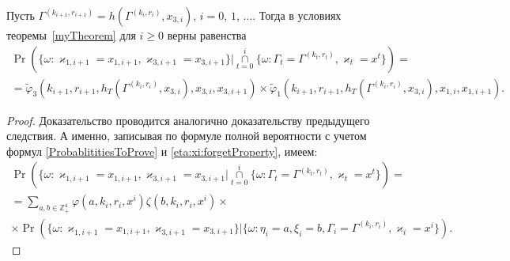 \documentclass{report}
\begin{document}
\begin{corollary}
Пусть $\Gamma^{(k_{i+1},r_{i+1})}=h(\Gamma^{(k_i,r_i)},x_{3,i})$, $i=0$, $1$, $\ldots$. Тогда в условиях теоремы~\ref{myTheorem} для $i \geqslant 0$ верны равенства
\begin{multline}
\Pr (\{ \omega \colon \varkappa_{1,i+1} = x_{1,i+1}, \varkappa_{3,i+1} = x_{3,i+1}\} |\mathop{\cap}\limits_{t=0}^{i}\{\omega\colon \Gamma_t=\Gamma^{(k_t,r_t)}, \varkappa_t=x^t\})=\\
=\widetilde{\varphi}_3(k_{i+1},r_{i+1},h_T(\Gamma^{(k_i,r_i)},x_{3,i}),x_{3,i},x_{3,i+1}) \times \widetilde{\varphi}_1(k_{i+1},r_{i+1},h_T(\Gamma^{(k_i,r_i)},x_{3,i}),x_{1,i},x_{1,i+1}).
\label{kappa:1:kappa:3:conditional}
\end{multline}
\end{corollary}
\begin{proof}
Доказательство проводится аналогично доказательству предыдущего следствия. А именно, записывая по формуле полной вероятности с учетом формул \eqref{ProbablititiesToProve} и \eqref{eta:xi:forgetProperty}, имеем:
\begin{multline*}
\Pr (\{ \omega \colon \varkappa_{1,i+1} = x_{1,i+1}, \varkappa_{3,i+1} = x_{3,i+1} |\mathop{\cap}\limits_{t=0}^{i}\{\omega\colon \Gamma_t=\Gamma^{(k_t,r_t)}, \varkappa_t=x^t\}) =\\
=\sum_{a,b\in \mathbb{Z}_+^4} \varphi(a,k_i,r_i,x^i)\zeta(b,k_i,r_i,x^i) \times\\
\times \Pr (\{ \omega \colon \varkappa_{1,i+1} = x_{1,i+1}, \varkappa_{3,i+1} = x_{3,i+1}\} |\{\omega\colon \eta_i=a, \xi_i=b, \Gamma_i=\Gamma^{(k_i,r_i)}, \varkappa_i=x^i\}).
\end{multline*}



\end{proof}
\end{document}
